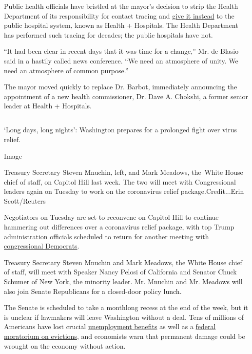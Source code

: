 Public health officials have bristled at the mayor's decision to strip
the Health Department of its responsibility for contact tracing and
\href{https://www.nytimes.com/2020/05/07/nyregion/coronavirus-contact-tracing-nyc.html}{give
it instead} to the public hospital system, known as Health + Hospitals.
The Health Department has performed such tracing for decades; the public
hospitals have not.

``It had been clear in recent days that it was time for a change,'' Mr.
de Blasio said in a hastily called news conference. ``We need an
atmosphere of unity. We need an atmosphere of common purpose.''

The mayor moved quickly to replace Dr. Barbot, immediately announcing
the appointment of a new health commissioner, Dr. Dave A. Chokshi, a
former senior leader at Health + Hospitals.

\hypertarget{-2}{%
\subsection{}\label{-2}}

`Long days, long nights': Washington prepares for a prolonged fight over
virus relief.

Image

Treasury Secretary Steven Mnuchin, left, and Mark Meadows, the~White
House chief of staff, on Capitol Hill last week. The two will meet with
Congressional leaders again on Tuesday to work on the coronavirus relief
package.Credit...Erin Scott/Reuters

Negotiators on Tuesday are set to reconvene on Capitol Hill to continue
hammering out differences over a coronavirus relief package, with top
Trump administration officials scheduled to return for
\href{https://www.nytimes.com/2020/08/02/us/politics/coronavirus-jobless-aid.html}{another
meeting with congressional Democrats}.

Treasury Secretary Steven Mnuchin and Mark Meadows, the White House
chief of staff, will meet with Speaker Nancy Pelosi of California and
Senator Chuck Schumer of New York, the minority leader. Mr. Mnuchin and
Mr. Meadows will also join Senate Republicans for a closed-door policy
lunch.

The Senate is scheduled to take a monthlong recess at the end of the
week, but it is unclear if lawmakers will leave Washington without a
deal. Tens of millions of Americans have lost crucial
\href{https://www.nytimes.com/2020/07/30/business/unemployment-payments-change.html}{unemployment
benefits} as well as a
\href{https://www.nytimes.com/2020/07/23/business/evictions-moratorium-cares-act.html}{federal
moratorium on evictions}, and economists warn that permanent damage
could be wrought on the economy without action.

